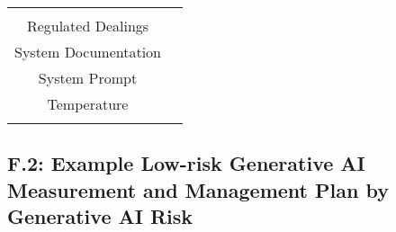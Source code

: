 \documentclass[fleqn]{article}
\begin{document}
\begin{table}[H]
\begin{tabular}{|c|c|}
{			\textbullet\hspace{3pt} Instructions\\ 			 
			\textbullet\hspace{3pt} Regulated Dealings \\ 
			\textbullet\hspace{3pt} System Documentation\\ 			
			\textbullet\hspace{3pt} System Prompt \\ 
			\textbullet\hspace{3pt} Temperature \\ 	
		}
		\\
		\hline
	\end{tabular}
	\label{table:low_risk_plan_by_tc_cont2}
\end{table}

\subsection*{F.2: Example Low-risk Generative AI Measurement and Management Plan by Generative AI Risk}\label{appdxf2}
\end{document}
